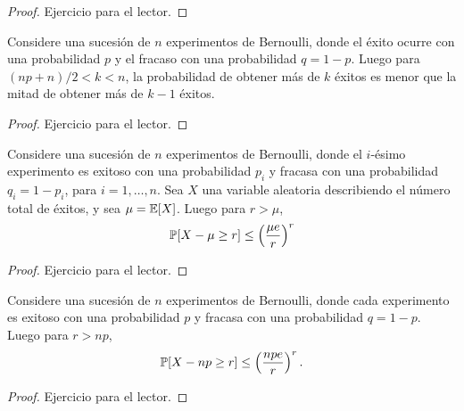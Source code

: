 \begin{proof}
    Ejercicio para el lector.
\end{proof}

\begin{corollary}
    Considere una sucesi\'on de $n$ experimentos de Bernoulli, donde el \'exito ocurre con una probabilidad $p$
    y el fracaso con una probabilidad $q = 1 - p$. Luego para $(np + n) / 2 < k < n$, la probabilidad de obtener
    m\'as de $k$ \'exitos es menor que la mitad de obtener m\'as de $k - 1$ \'exitos.
\end{corollary}

\begin{proof}
    Ejercicio para el lector.
\end{proof}

\begin{theorem}
    Considere una sucesi\'on de $n$ experimentos de Bernoulli, donde el $i$-\'esimo experimento es exitoso
    con una probabilidad $p_i$ y fracasa con una probabilidad $q_i = 1 - p_i$, para $i = 1, \dots, n$.
    Sea $X$ una variable aleatoria describiendo el n\'umero total de \'exitos, y sea $\mu = \mathbb{E}[X]$.
    Luego para $r > \mu$,
    \[
        \mathbb{P}[X - \mu \geq r] \leq \left(\frac{\mu e}{r}\right)^r
    \]
\end{theorem}

\begin{proof}
    Ejercicio para el lector.
\end{proof}

\begin{theorem}
    Considere una sucesi\'on de $n$ experimentos de Bernoulli, donde cada experimento es exitoso
    con una probabilidad $p$ y fracasa con una probabilidad $q = 1 - p$. Luego para $r > np$,
    \[
        \mathbb{P}[X - np \geq r] \leq \left(\frac{npe}{r}\right)^r.
    \]
\end{theorem}

\begin{proof}
    Ejercicio para el lector.
\end{proof}















